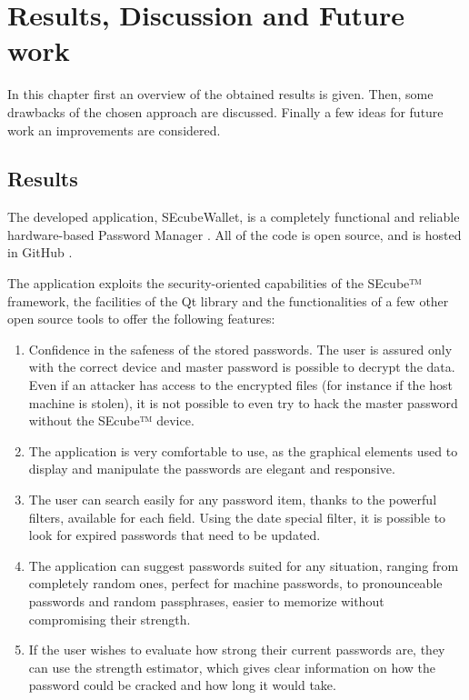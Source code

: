 \chapter{Results, Discussion and Future work} \label{chap:res}

In this chapter first an overview of the obtained results is given. Then, some drawbacks of the chosen approach are discussed. Finally a few ideas for future work an improvements are considered.

\section{Results}

The developed application, SEcubeWallet, is a completely functional and reliable hardware-based Password Manager . All of the code is open source, and is hosted in GitHub \cite{secubewallet}.

The application exploits the security-oriented capabilities of the SEcube™ framework, the facilities of the Qt library and the functionalities of a few other open source tools to offer the following features:

\begin{enumerate}
\setlength\itemsep{0pt}
\item Confidence in the safeness of the stored passwords. The user is assured only with the correct device and master password is possible to decrypt the data. Even if an attacker has access to the encrypted files (for instance if the host machine is stolen), it is not possible to even try to hack the master password without the SEcube™ device.
\item The application is very comfortable to use, as the graphical elements used to display and manipulate the passwords are elegant and responsive.
\item The user can search easily for any password item, thanks to the powerful filters, available for each field. Using the date special filter, it is possible to look for expired passwords that need to be updated.
\item The application can suggest passwords suited for any situation, ranging from completely random ones, perfect for machine passwords, to pronounceable passwords and random passphrases, easier to memorize without compromising their strength.
\item If the user wishes to evaluate how strong their current passwords are, they can use the strength estimator, which gives clear information on how the password could be cracked and how long it would take.
\end{enumerate}

